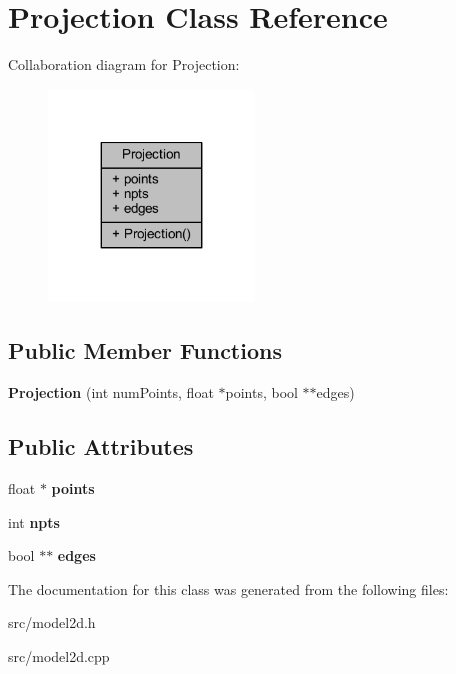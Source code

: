 \hypertarget{class_projection}{}\section{Projection Class Reference}
\label{class_projection}


Collaboration diagram for Projection\+:
\nopagebreak
\begin{figure}[H]
\begin{center}
\leavevmode
\includegraphics[width=155pt]{class_projection__coll__graph}
\end{center}
\end{figure}
\subsection*{Public Member Functions}
\begin{DoxyCompactItemize}
\item 
\mbox{\label{class_projection_a5308ac2fb97e9805c76e3cf767f08a0e}} 
{\bfseries Projection} (int num\+Points, float $\ast$points, bool $\ast$$\ast$edges)
\end{DoxyCompactItemize}
\subsection*{Public Attributes}
\begin{DoxyCompactItemize}
\item 
\mbox{\label{class_projection_aa42ba5494690dbfa5f875472adc97789}} 
float $\ast$ {\bfseries points}
\item 
\mbox{\label{class_projection_a6972ab0bc1cfa26a5480a940d66e3497}} 
int {\bfseries npts}
\item 
\mbox{\label{class_projection_a7943c696e88d15825dee0641b269b5f7}} 
bool $\ast$$\ast$ {\bfseries edges}
\end{DoxyCompactItemize}


The documentation for this class was generated from the following files\+:\begin{DoxyCompactItemize}
\item 
src/model2d.\+h\item 
src/model2d.\+cpp\end{DoxyCompactItemize}
